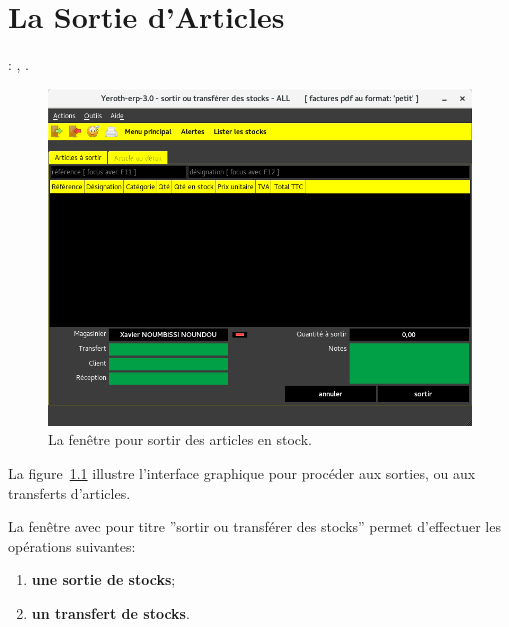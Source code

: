 \chapter{La Sortie d'Articles}\label{chap:sortir-articles}

\utilisateurs: \lienmagasinier, \lienpatron.\\



\begin{figure}[!htbp]
	\centering
	\includegraphics[scale=0.63]{images/yeren-fenetre-sortir-articles.png}
	\caption{La fen\^etre pour sortir des articles en stock.}
	\label{fig:yeren-fenetre-sortir-articles}
\end{figure}

La figure~\ref{fig:yeren-fenetre-sortir-articles} illustre
l'interface graphique pour proc\'eder aux sorties, ou aux
transferts d'articles.

La fen\^etre avec pour titre ''sortir ou transf\'erer des stocks''
permet d'effectuer les op\'erations suivantes:
\begin{enumerate}[1)]
	\item \textbf{une sortie de stocks};
	\item \textbf{un transfert de stocks}.\\
\end{enumerate}

